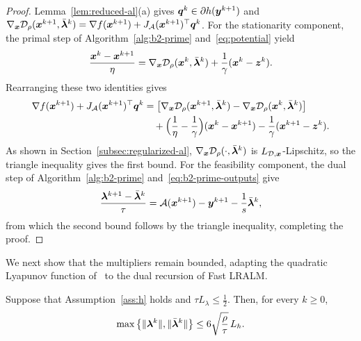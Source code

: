 \begin{proof}
Lemma~\ref{lem:reduced-al}(a) gives \(\bm{q}^k\in\partial h(\bm{y}^{k+1})\) and
\(\nabla_{\bm{x}}\mathcal{D}_\rho(\bm{x}^{k+1},\bar{\bm{\lambda}}^k)
=\nabla f(\bm{x}^{k+1})+J_{\mathcal{A}}(\bm{x}^{k+1})^\top\bm{q}^k\). For the stationarity
component, the primal step of Algorithm~\ref{alg:b2-prime}
and~\eqref{eq:potential} yield
\[
    \frac{\bm{x}^k-\bm{x}^{k+1}}{\eta}
    =\nabla_{\bm{x}}\mathcal{D}_\rho(\bm{x}^k,\bar{\bm{\lambda}}^k)+\frac{1}{\gamma}(\bm{x}^k-\bm{z}^k).
\]
Rearranging these two identities gives
\[
\begin{aligned}
    \nabla f(\bm{x}^{k+1})+J_{\mathcal{A}}(\bm{x}^{k+1})^\top\bm{q}^k
    &=\bigl[\nabla_{\bm{x}}\mathcal{D}_\rho(\bm{x}^{k+1},\bar{\bm{\lambda}}^k)
    -\nabla_{\bm{x}}\mathcal{D}_\rho(\bm{x}^k,\bar{\bm{\lambda}}^k)\bigr]\\
    &\quad+\Bigl(\frac{1}{\eta}-\frac{1}{\gamma}\Bigr)(\bm{x}^k-\bm{x}^{k+1})
    -\frac{1}{\gamma}(\bm{x}^{k+1}-\bm{z}^k).
\end{aligned}
\]
As shown in Section~\ref{subsec:regularized-al},
\(\nabla_{\bm{x}}\mathcal{D}_\rho(\cdot,\bar{\bm{\lambda}}^k)\) is
\(L_{\mathcal{D},\bm{x}}\)-Lipschitz, so the triangle inequality gives the first
bound. For the feasibility component, the dual step of
Algorithm~\ref{alg:b2-prime} and~\eqref{eq:b2-prime-outputs} give
\[
    \frac{\bm{\lambda}^{k+1}-\bar{\bm{\lambda}}^k}{\tau}
    =\mathcal{A}(\bm{x}^{k+1})-\bm{y}^{k+1}-\frac{1}{s}\bar{\bm{\lambda}}^k,
\]
from which the second bound follows by the triangle inequality, completing the proof.
\end{proof}

We next show that the multipliers remain bounded, adapting the quadratic Lyapunov function of~\cite[Section~2.3]{khlebnikov2011optimization} to the dual recursion of Fast LRALM.
\begin{lemma}
\label{lem:b2-prime-multiplier-bounds}
Suppose that Assumption~\ref{ass:h} holds and
\(\tau L_\lambda\le\frac12\). Then, for every \(k\ge0\),
\[
    \max\left\{\|\bm{\lambda}^k\|,\|\bar{\bm{\lambda}}^k\|\right\}
    \le6\sqrt{\frac{\rho}{\tau}}\,L_h.
\]
\end{lemma}

